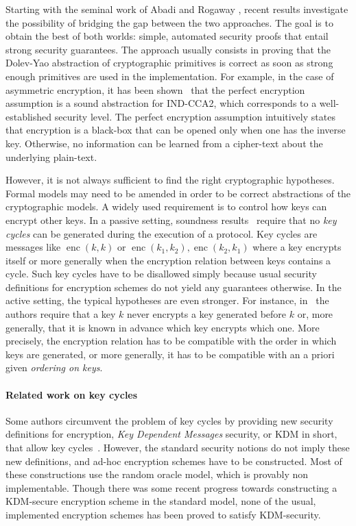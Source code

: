 \documentclass[acmtocl,acmnow]{acmtrans2m}
\newcommand{\enc}{\operatorname{enc}}
\begin{document}
Starting with the seminal work of Abadi and Rogaway
\cite{ARCryptology02}, recent results investigate the possibility of
bridging the gap between the two approaches.  The goal is to obtain
the best of both worlds: simple, automated security proofs that entail
strong security guarantees.  The approach usually consists in proving
that the Dolev-Yao abstraction of cryptographic primitives 
 is correct as soon as strong enough primitives are used in the
implementation.  For example, in the case of asymmetric encryption, it
has been shown~\cite{Micciancio_Warinschi_TCC04_soundness_of_formal_encryption}
that the perfect encryption assumption is a sound abstraction for
IND-CCA2, which corresponds to a well-established security level.  The
perfect encryption assumption intuitively states that encryption is a
black-box that can be opened only when one has the inverse
key. Otherwise, no information can be learned from a cipher-text about
the underlying plain-text.


However, it is not always sufficient to find the right cryptographic
hypotheses. Formal models may need to be amended in order to be
correct abstractions of the cryptographic models. A  widely used requirement is to control how keys can
encrypt other keys.  In a passive setting, soundness
results~\cite{ARCryptology02,MW04} require that no \emph{key cycles}
can be generated during the execution of a protocol. Key cycles are
messages like $\enc(k,k)$ or $\enc(k_1,k_2),\enc(k_2,k_1)$ where a key
encrypts itself or more generally when the encryption relation between
keys contains a cycle. Such key cycles have to be disallowed simply
because usual security definitions for encryption schemes do not
yield any guarantees otherwise.  In the active
setting, the typical hypotheses are even stronger.  For instance,
in~\cite{Backes_Pfitzmann_CSFW04_symmetric_encryption,cryptoeprint:2005:020}
the authors require that a key $k$ never encrypts a key generated
before $k$ or, more generally, that it is known in advance which key
encrypts which one. More precisely, the encryption relation has to be
compatible with the order in which keys are generated, or more
generally, it has to be compatible with an {a priori} given
\emph{ordering on keys}.

\paragraph{Related work on key cycles} 
Some authors circumvent the problem of key cycles by providing new
security definitions for encryption, \emph{Key Dependent Messages} security, or
KDM in short, that allow key
cycles~\cite{AdaoBanaHerzogScedrov-ESORICS05,backes07key}. However,
the standard security notions do not imply these new definitions, and
ad-hoc encryption schemes have to be constructed. 
Most of these constructions use the random oracle model, which
is provably non implementable. Though there was some recent
progress  \cite{hofheinz08towards} towards constructing a KDM-secure
encryption scheme in the standard model,
none of the usual, implemented encryption schemes has
been proved to satisfy KDM-security.
\end{document}
